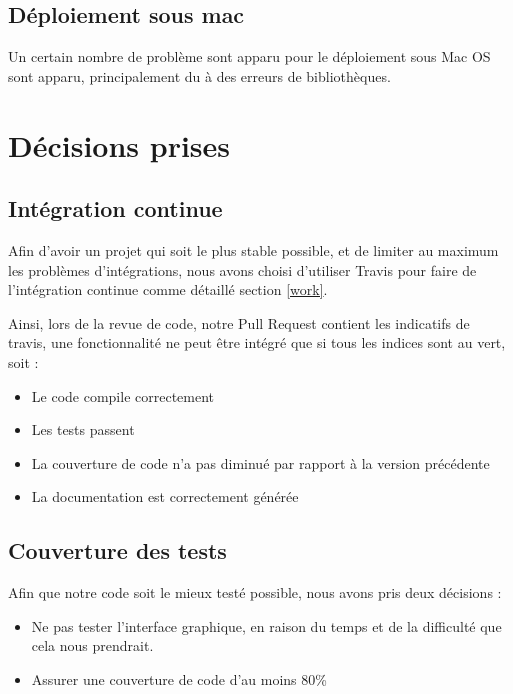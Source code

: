 \documentclass[12pt,a4paper,openany]{article}
\begin{document}
	\subsection{Déploiement sous mac}
	Un certain nombre de problème sont apparu pour le déploiement sous Mac OS sont apparu, principalement du à des erreurs de bibliothèques.

	\section{Décisions prises}
	\subsection{Intégration continue}
	Afin d'avoir un projet qui soit le plus stable possible, et de limiter au maximum les problèmes d'intégrations, nous avons choisi d'utiliser
	Travis pour faire de l'intégration continue comme détaillé section \ref{work}.

	Ainsi, lors de la revue de code, notre Pull Request contient les indicatifs de travis, une fonctionnalité ne peut être intégré que si tous les
	indices sont au vert, soit : 
	\begin{itemize}
		\item Le code compile correctement
		\item Les tests passent
		\item La couverture de code n'a pas diminué par rapport à la version précédente
		\item La documentation est correctement générée
	\end{itemize}

	\subsection{Couverture des tests}
	Afin que notre code soit le mieux testé possible, nous avons pris deux décisions : 
	\begin{itemize}
		\item Ne pas tester l'interface graphique, en raison du temps et de la difficulté que cela nous prendrait.
		\item Assurer une couverture de code d'au moins 80\%
	\end{itemize}
\end{document}
